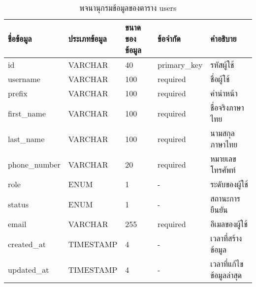 \begin{table}[H]
    \caption{พจนานุกรมข้อมูลของตาราง users}
    \label{tab:database-users}
    \begin{tabularx}{\textwidth}{ | p{2.25cm} | p{2.20cm} | p{2.45cm} | p{2cm} | X | }
    \hline
    \textbf{ชื่อข้อมูล} & \textbf{ประเภทข้อมูล} & \textbf{ขนาดของข้อมูล} & \textbf{ข้อจำกัด} & \textbf{คำอธิบาย} \\
    \hline
    id & VARCHAR & 40 & primary\_key & รหัสผู้ใช้ \\
    \hline
    username & VARCHAR & 100 & required & ชื่อผู้ใช้ \\
    \hline
    prefix & VARCHAR & 100 & required & คำนำหน้า \\
    \hline
    first\_name & VARCHAR & 100 & required & ชื่อจริงภาษาไทย \\
    \hline
    last\_name & VARCHAR & 100 & required & นามสกุลภาษาไทย \\
    \hline
    phone\_number & VARCHAR & 20 & required & หมายเลขโทรศัพท์ \\
    \hline
    role & ENUM & 1 & - & ระดับของผู้ใช้ \\
    \hline
    status & ENUM & 1 & - & สถานะการยืนยัน \\
    \hline
    email & VARCHAR & 255 & required & อีเมลของผู้ใช้ \\
    \hline
    created\_at & TIMESTAMP & 4 & - & เวลาที่สร้างข้อมูล \\
    \hline
    updated\_at & TIMESTAMP & 4 & - & เวลาที่แก้ไขข้อมูลล่าสุด \\
    \hline
    \end{tabularx}
\end{table}
